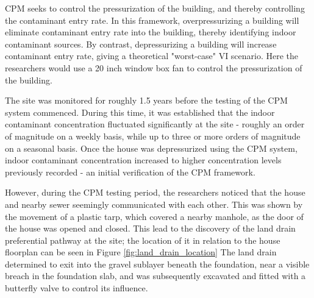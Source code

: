 CPM seeks to control the pressurization of the building, and thereby controlling the contaminant entry rate.
In this framework, overpressurizing a building will eliminate contaminant entry rate into the building, thereby identifying indoor contaminant sources.
By contrast, depressurizing a building will increase contaminant entry rate, giving a theoretical "worst-case" VI scenario.
Here the researchers would use a 20 inch window box fan to control the pressurization of the building.\par

The site was monitored for roughly 1.5 years before the testing of the CPM system commenced.
During this time, it was established that the indoor contaminant concentration fluctuated significantly at the site - roughly an order of magnitude on a weekly basis, while up to three or more orders of magnitude on a seasonal basis.
Once the house was depressurized using the CPM system, indoor contaminant concentration increased to higher concentration levels previously recorded - an initial verification of the CPM framework\cite{holton_long-term_2015}.\par

However, during the CPM testing period, the researchers noticed that the house and nearby sewer seemingly communicated with each other.
This was shown by the movement of a plastic tarp, which covered a nearby manhole, as the door of the house was opened and closed.
This lead to the discovery of the land drain preferential pathway at the site; the location of it in relation to the house floorplan can be seen in Figure \ref{fig:land_drain_location}
The land drain determined to exit into the gravel sublayer beneath the foundation, near a visible breach in the foundation slab, and was subsequently excavated and fitted with a butterfly valve \cite{guo_identification_2015} to control its influence.\par


